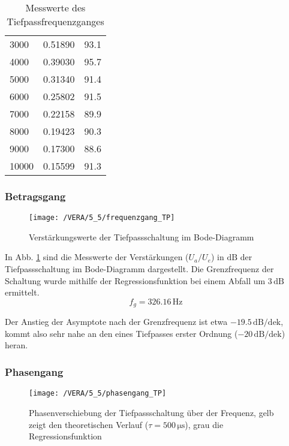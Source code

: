 \begin{table}[H]
\begin{center}
\begin{tabular}{@{}lll@{}}
3000              & 0.51890                             & 93.1                 \\
4000              & 0.39030                             & 95.7                 \\
5000              & 0.31340                             & 91.4                 \\
6000              & 0.25802                            & 91.5                 \\
7000              & 0.22158                            & 89.9                 \\
8000              & 0.19423                            & 90.3                 \\
9000              & 0.17300                              & 88.6                 \\
10000             & 0.15599                            & 91.3                 \\ \bottomrule
\end{tabular}
\end{center}
\caption{Messwerte des Tiefpassfrequenzganges}
\end{table}

\subsubsection{Betragsgang}

\begin{figure}[H]
\begin{center}
  \texttt{[image: /VERA/5\_5/frequenzgang\_TP]}
\end{center}
\caption{Verstärkungswerte der Tiefpassschaltung im Bode-Diagramm}
\label{fig:tpverst}
\end{figure}

In Abb. \ref{fig:tpverst} sind die Messwerte der Verstärkungen ($U_a / U_e$)
in $\si{\deci\bel}$ der
Tiefpassschaltung im Bode-Diagramm dargestellt. Die Grenzfrequenz der Schaltung wurde mithilfe der
Regressionsfunktion bei einem Abfall um $3\, \si{\deci\bel}$ ermittelt.
\[f_g = 326.16 \, \si{\hertz}\]

Der Anstieg der Asymptote nach der Grenzfrequenz ist etwa $-19.5 \,
\si{\deci\bel}/\mathrm{dek}$, kommt also sehr nahe an den eines Tiefpasses
erster Ordnung ($-20\,\si{\deci\bel}/\textrm{dek}$) heran.

\subsubsection{Phasengang}
\begin{figure}[H]
\begin{center}
  \texttt{[image: /VERA/5\_5/phasengang\_TP]}
\end{center}
\caption{Phasenverschiebung der Tiefpassschaltung über der Frequenz, gelb zeigt
  den theoretischen Verlauf ($\tau = 500 \, \si{\micro\second}$), grau die Regressionsfunktion}
\label{fig:tpphase}
\end{figure}

